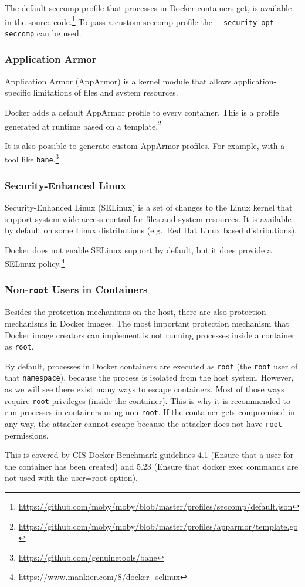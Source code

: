 \medskip

The default seccomp profile that processes in Docker containers get, is available in the source code.\footnote{\url{https://github.com/moby/moby/blob/master/profiles/seccomp/default.json}} To pass a custom seccomp profile the \lstinline{--security-opt seccomp} can be used.

\subsubsection{Application Armor}
Application Armor (AppArmor) is a kernel module that allows application-specific limitations of files and system resources.

Docker adds a default AppArmor profile to every container. This is a profile generated at runtime based on a template.\footnote{\url{https://github.com/moby/moby/blob/master/profiles/apparmor/template.go}}

\medskip

It is also possible to generate custom AppArmor profiles. For example, with a tool like \lstinline{bane}.\footnote{\url{https://github.com/genuinetools/bane}}

\subsubsection{Security-Enhanced Linux}
Security-Enhanced Linux (SELinux) is a set of changes to the Linux kernel that support system-wide access control for files and system resources. It is available by default on some Linux distributions (e.g.\ Red Hat Linux based distributions).

\medskip

Docker does not enable SELinux support by default, but it does provide a SELinux policy.\footnote{\url{https://www.mankier.com/8/docker_selinux}}

\subsubsection{Non-\texorpdfstring{\lstinline{root}}{root} Users in Containers}\label{subsection:non-root-user}
Besides the protection mechanisms on the host, there are also protection mechanisms in Docker images. The most important protection mechanism that Docker image creators can implement is not running processes inside a container as \lstinline{root}.

By default, processes in Docker containers are executed as \lstinline{root} (the \lstinline{root} user of that \lstinline{namespace}), because the process is isolated from the host system. However, as we will see there exist many ways to escape containers. Most of those ways require \lstinline{root} privileges (inside the container). This is why it is recommended to run processes in containers using non-\lstinline{root}. If the container gets compromised in any way, the attacker cannot escape because the attacker does not have \lstinline{root} permissions.

\medskip

This is covered by CIS Docker Benchmark guidelines 4.1 (Ensure that a user for the container has been created) and 5.23 (Ensure that docker exec commands are not used with the user=root option).
